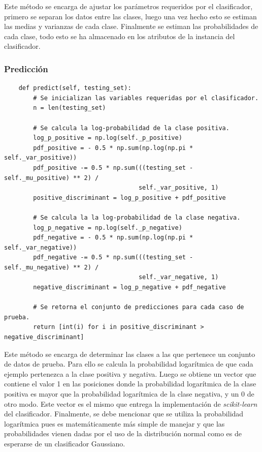 \documentclass[letter, titlepage, 10pt]{article}
\begin{document}
Este método se encarga de ajustar los parámetros requeridos por el clasificador, primero se separan los datos entre las clases, luego una vez hecho esto se estiman las medias y varianzas de cada clase. Finalmente se estiman las probabilidades de cada clase, todo esto se ha almacenado en los atributos de la instancia del clasificador.\\

\subsubsection{Predicción}
\begin{lstlisting}
    def predict(self, testing_set):
        # Se inicializan las variables requeridas por el clasificador.
        n = len(testing_set)

        # Se calcula la log-probabilidad de la clase positiva.
        log_p_positive = np.log(self._p_positive)
        pdf_positive = - 0.5 * np.sum(np.log(np.pi * self._var_positive))
        pdf_positive -= 0.5 * np.sum(((testing_set - self._mu_positive) ** 2) /
                                     self._var_positive, 1)
        positive_discriminant = log_p_positive + pdf_positive

        # Se calcula la la log-probabilidad de la clase negativa.
        log_p_negative = np.log(self._p_negative)
        pdf_negative = - 0.5 * np.sum(np.log(np.pi * self._var_negative))
        pdf_negative -= 0.5 * np.sum(((testing_set - self._mu_negative) ** 2) /
                                     self._var_negative, 1)
        negative_discriminant = log_p_negative + pdf_negative

        # Se retorna el conjunto de predicciones para cada caso de prueba.
        return [int(i) for i in positive_discriminant > negative_discriminant]
\end{lstlisting}

Este método se encarga de determinar las clases a las que pertenece un conjunto de datos de prueba. Para ello se calcula la probabilidad logarítmica de que cada ejemplo pertenezca a la clase positiva y negativa. Luego se obtiene un vector que contiene el valor 1 en las posiciones donde la probabilidad logarítmica de la clase positiva es mayor que la probabilidad logarítmica de la clase negativa, y un 0 de otro modo. Este vector es el mismo que entrega la implementación de \textit{scikit-learn} del clasificador. Finalmente, se debe mencionar que se utiliza la probabilidad logarítmica pues es matemáticamente más simple de manejar y que las probabilidades vienen dadas por el uso de la distribución normal como es de esperarse de un clasificador Gaussiano.\\
\end{document}
